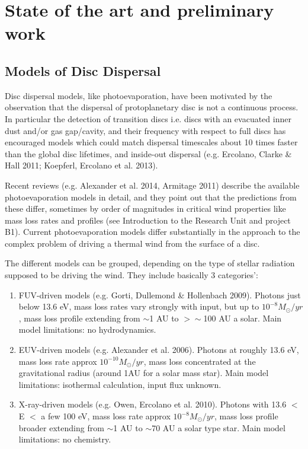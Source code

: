 \documentclass[10pt,fleqn,twoside]{article}
\newcommand{\Tcol}{\color{blue}}
\begin{document}
\section{\Tcol State of the art and preliminary work}
\renewcommand{\leftmark}{\sc State of the Art and preliminary work}

\subsection{\Tcol Models of Disc Dispersal}

Disc dispersal models, like photoevaporation, have been motivated by
the observation that the dispersal of protoplanetary disc is
not a continuous process. In particular the detection of transition
discs i.e. discs with an evacuated inner dust
and/or gas gap/cavity, and their frequency with respect to full discs
has encouraged models which could match dispersal
timescales about 10 times faster than the global disc
lifetimes, and inside-out dispersal  (e.g. Ercolano, Clarke \& Hall 2011;
Koepferl, Ercolano et al. 2013). 

Recent reviews (e.g. Alexander et al. 2014, Armitage 2011) describe
the available photoevaporation models in detail, and they point out that the
predictions from these differ, sometimes by order of magnitudes in
critical wind properties like mass loss rates and profiles (see
Introduction to the Research Unit and project B1). Current
photoevaporation models differ
substantially in the approach to the complex problem of driving a
thermal wind from the surface of a disc. 

The different models can be grouped, depending on
the type of stellar radiation supposed to be driving the wind. They
include basically 3 categories':

\begin{enumerate}
\item FUV-driven models (e.g. Gorti, Dullemond \& Hollenbach
  2009). Photons just below 13.6 eV, mass loss rates vary strongly
  with input, but up to $10^{-8}M_{\odot}/yr$, mass
loss profile extending from $\sim$1 AU to  $>\sim$100 AU a
solar. Main model limitations: no hydrodynamics. 
\item EUV-driven models (e.g. Alexander et al. 2006). Photons at
  roughly 13.6 eV, mass loss rate approx $10^{-10}M_{\odot}/yr$, mass
loss concentrated at the gravitational radius (around 1AU for a solar
mass star). Main model limitations: isothermal calculation, input flux
unknown. 
\item X-ray-driven models (e.g. Owen, Ercolano et al. 2010). Photons
  with 13.6 $<$ E $<$ a few 100 eV, mass loss rate approx $10^{-8}M_{\odot}/yr$, mass
loss profile broader extending from $\sim$1 AU to  $\sim$70 AU a solar
type star. Main model limitations: no chemistry. 
\end{enumerate}
\end{document}
